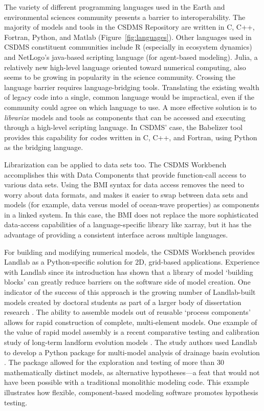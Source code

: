 \documentclass{article} %
\begin{document}
The variety of different programming languages used in the Earth and environmental sciences community presents a barrier to interoperability. The majority of models and tools in the CSDMS Repository are written in C, C++, Fortran, Python, and Matlab (Figure~\ref{fig:languages}). Other languages used in CSDMS constituent communities include R (especially in ecosystem dynamics) and NetLogo's java-based scripting language (for agent-based modeling). Julia, a relatively new high-level language oriented toward numerical computing, also seems to be growing in popularity in the science community. Crossing the language barrier requires language-bridging tools. Translating the existing wealth of legacy code into a single, common language would be impractical, even if the community could agree on which language to use. A more effective solution is to \textit{librarize} models and tools \citep{brown2014run} as components that can be accessed and executing through a high-level scripting language. In CSDMS' case, the Babelizer tool provides this capability for codes written in C, C++, and Fortran, using Python as the bridging language.

Librarization can be applied to data sets too. The CSDMS Workbench accomplishes this with Data Components that provide function-call access to various data sets. Using the BMI syntax for data access removes the need to worry about data formats, and makes it easier to swap between data sets and models (for example, data versus model of ocean-wave properties) as components in a linked system. In this case, the BMI does not replace the more sophisticated data-access capabilities of a language-specific library like xarray, but it has the advantage of providing a consistent interface across multiple languages.

For building and modifying numerical models, the CSDMS Workbench provides Landlab as a Python-specific solution for 2D, grid-based applications. Experience with Landlab since its introduction has shown that a library of model `building blocks' can greatly reduce barriers on the software side of model creation. One indicator of the success of this approach is the growing number of  Landlab-built models created by doctoral students as part of a larger body of dissertation research \citep[e.g.,][]{adams2017landlab,gray2017off,shobe2017space,lai2018modeled,langston2018developing,schmid2018effect,strauch2018hydroclimatological,glade2019canyon,reitman2019offset,carriere2020impact,litwin2020groundwaterdupuitpercolator}. The ability to assemble models out of reusable `process components' allows for rapid construction of complete, multi-element models. One example of the value of rapid model assembly is a recent  comparative testing and calibration study of long-term landform evolution models \citep{barnhart2020inverting1,barnhart2020inverting2}. The study authors used Landlab to develop a Python package for multi-model analysis of drainage basin evolution \citep{barnhart2019terrainbento}. The package allowed for the exploration and testing of more than 30 mathematically distinct models, as alternative hypotheses---a feat that would not have been possible with a traditional monolithic modeling code. This example illustrates how flexible, component-based modeling software promotes hypothesis testing. 
\end{document}

